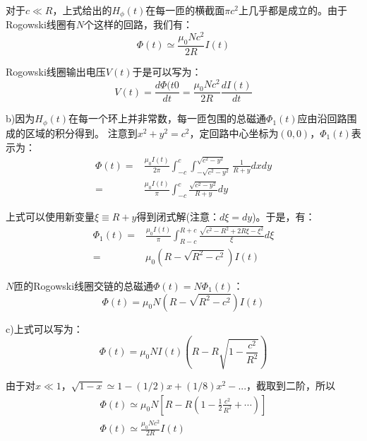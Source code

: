 对于$c\ll R$，上式给出的$H_\phi(t)$在每一匝的横截面$\pi c^2$上几乎都是成立的。由于Rogowski线圈有$N$个这样的回路，我们有：
\begin{equation*}
\Phi(t)\simeq \frac{\mu_0 N c^2}{2R}I(t)  \tag{2.69}
\end{equation*}

Rogowski线圈输出电压$V(t)$于是可以写为：
\begin{equation*}
V(t)=\frac{d\Phi(t0}{dt}=\frac{\mu_0 N c^2}{2R}\frac{dI(t)}{dt}  \tag{S9.2}
\end{equation*}

b)因为$H_\phi (t)$在每一个环上并非常数，每一匝包围的总磁通$\Phi_1(t)$应由沿回路围成的区域的积分得到。
注意到$x^2+y^2=c^2$，定回路中心坐标为$(0,0)$，$\Phi_1(t)$表示为：
\begin{align}
\Phi (t)=&\frac{\mu_0 I(t)}{2\pi}\int_{-c}^{c}\int_{-\sqrt{c^2-y^2}}^{\sqrt{c^2-y^2}}\frac{1}{R+y}dxdy\nonumber\\
=&\frac{\mu_0 I(t)}{\pi}\int_{-c}^{c}\frac{\sqrt{c^2-y^2}}{R+y}dy\nonumber\tag{S9.3}
\end{align}

上式可以使用新变量$\xi\equiv R+y$得到闭式解(注意：$d\xi=dy$)。于是，有：
\begin{align}
\Phi_1 (t)=&\frac{\mu_0 I(t)}{\pi} \int_{R-c}^{R+c}\frac{\sqrt{c^2-R^2+2R\xi-\xi^2}}{\xi}d\xi\nonumber\\
=&\mu_0(R-\sqrt{R^2-c^2})I(t)\nonumber\tag{S9.4}
\end{align}

$N$匝的Rogowski线圈交链的总磁通$\Phi(t)=N\Phi_1(t)$：
\begin{equation*}
\Phi (t)=\mu_0 N(R-\sqrt{R^2-c^2})I(t) \tag{2.70}
\end{equation*}

c)上式可以写为：
\begin{equation*}
\Phi (t)=\mu_0 NI(t)(R-R\sqrt{1-\frac{c^2}{R^2}}) \tag{S9.5}
\end{equation*}

由于对$x\ll 1$，$\sqrt{1-x}\simeq 1-(1/2)x+(1/8)x^2-...$，截取到二阶，所以
\begin{align}
\Phi(t)\simeq\mu_0 N\left[R-R\left(1-\frac{1}{2}\frac{c^2}{R^2}+\cdots\right)\right]\nonumber\tag{S9.6}\\
\Phi (t)\simeq \frac{\mu_0 Nc^2}{2R} I(t)\nonumber\tag{2.69}
\end{align}

